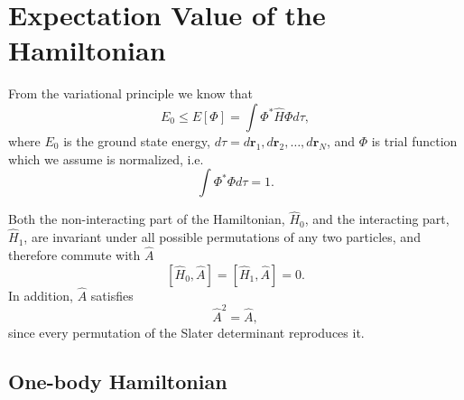 \documentclass[../main.tex]{subfiles}
\begin{document}
\section{Expectation Value of the Hamiltonian}

From the variational principle we know that
\begin{equation}
    E_0 \leq E\left[ \Phi \right] = \int \Phi^* \hat{H} \Phi d\tau,
\end{equation}
where $E_0$ is the ground state energy, $d\tau = d\mathbf{r}_1,d\mathbf{r}_2,\dots,d\mathbf{r}_N$, and $\Phi$ is trial function which we assume is normalized, i.e.
\begin{equation}
    \int \Phi^* \Phi d\tau = 1.
\end{equation}

Both the non-interacting part of the Hamiltonian, $\hat{H}_0$, and the interacting part, $\hat{H}_1$, are invariant under all possible permutations of any two particles, and therefore commute with $\hat{A}$
\begin{equation}\label{eq:HA commute}
    \left[ \hat{H}_0, \hat{A} \right] = \left[ \hat{H}_1, \hat{A} \right] = 0.
\end{equation}
In addition, $\hat{A}$ satisfies 
\begin{equation}\label{eq:A2=A}
    \hat{A}^2 = \hat{A},
\end{equation}
since every permutation of the Slater determinant reproduces it. 

\subsection{One-body Hamiltonian}
\end{document}
